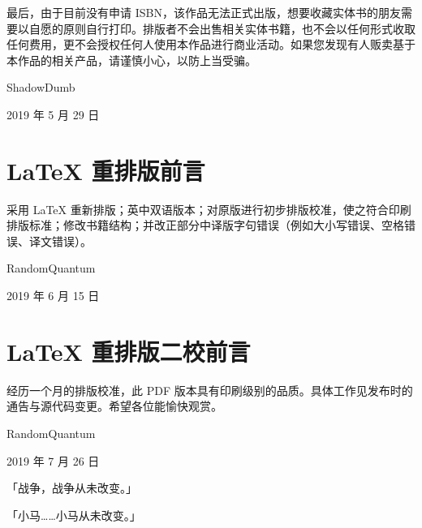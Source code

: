 最后，由于目前没有申请 ISBN，该作品无法正式出版，想要收藏实体书的朋友需要以自愿的原则自行打印。排版者不会出售相关实体书籍，也不会以任何形式收取任何费用，更不会授权任何人使用本作品进行商业活动。如果您发现有人贩卖基于本作品的相关产品，请谨慎小心，以防上当受骗。

\begin{flushright}
ShadowDumb

2019 年 5 月 29 日
\end{flushright}

\clearpage

\section*{\LaTeX{} 重排版前言}

采用 \LaTeX{} 重新排版；英中双语版本；对原版进行初步排版校准，使之符合印刷排版标准；修改书籍结构；并改正部分中译版字句错误（例如大小写错误、空格错误、译文错误）。

\begin{flushright}
RandomQuantum

2019 年 6 月 15 日
\end{flushright}

\section*{\LaTeX{} 重排版二校前言}

经历一个月的排版校准，此 PDF 版本具有印刷级别的品质。具体工作见发布时的通告与源代码变更。希望各位能愉快观赏。

\begin{flushright}
RandomQuantum

2019 年 7 月 26 日
\end{flushright}

\begin{motto}
「战争，战争从未改变。」

\medskip

「小马……小马从未改变。」
\end{motto}

